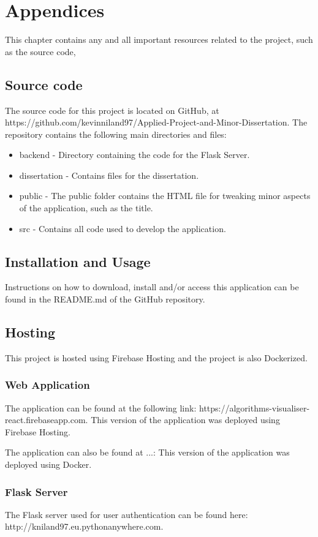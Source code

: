 \chapter{Appendices}
This chapter contains any and all important resources related to the project, such as the source code, 

\section{Source code}
The source code for this project is located on GitHub, at https://github.com/kevinniland97/Applied-Project-and-Minor-Dissertation. The repository contains the following main directories and files:

\begin{itemize}
    \item backend - Directory containing the code for the Flask Server.
    \item dissertation - Contains files for the dissertation.
    \item public - The public folder contains the HTML file for tweaking minor aspects of the application, such as the title.
    \item src - Contains all code used to develop the application.
\end{itemize}

\section{Installation and Usage}
Instructions on how to download, install and/or access this application can be found in the README.md of the GitHub repository.

\newpage
\section{Hosting}
This project is hosted using Firebase Hosting and the project is also Dockerized.

\subsection{Web Application}
The application can be found at the following link: https://algorithms-visualiser-react.firebaseapp.com. This version of the application was deployed using Firebase Hosting.

\medskip
The application can also be found at ...:   This version of the application was deployed using Docker.

\subsection{Flask Server}
The Flask server used for user authentication can be found here: http://kniland97.eu.pythonanywhere.com.